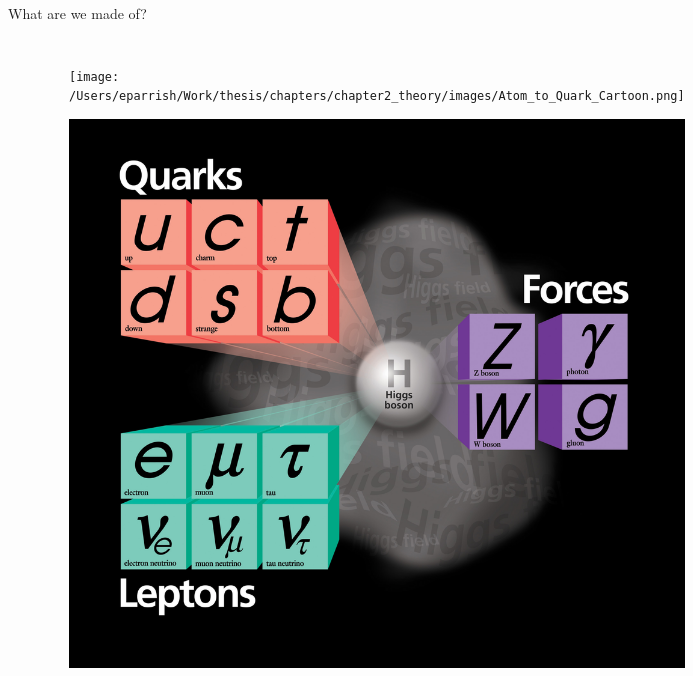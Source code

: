 \documentclass[aspectratio=169,xcolor=table]{beamer}
\begin{document}
\begin{frame}[t]{What are we made of?}
\begin{columns}
\begin{itemize}
\begin{itemize}
\begin{itemize}
            \end{itemize}
        \end{itemize}
      \end{itemize}
      \begin{figure}
        \centering
        \texttt{[image: /Users/eparrish/Work/thesis/chapters/chapter2\_theory/images/Atom\_to\_Quark\_Cartoon.png]}
        \caption{\tiny\cite{atom-to-quark} \cite{SM-Diagram}}
        \includegraphics[height=.4\textheight,keepaspectratio=true]{SM High Res.jpeg}
      \end{figure}
    \end{columns}
  \end{frame}

\end{document}
